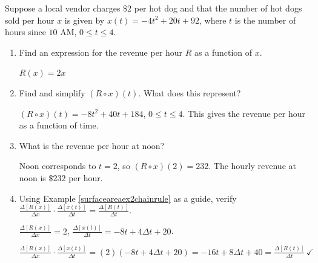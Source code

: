 \documentclass{ximera}
\begin{document}
\begin{problem}
Suppose a local vendor charges $\$2$ per hot dog and that the number of hot dogs sold per hour $x$ is given by $x(t) = -4t^2+20t+92$, where $t$ is the number of hours since $10$ AM, $0 \leq t \leq 4$.

\begin{enumerate}

\item  Find an expression for the revenue per hour $R$ as a function of $x$.

\begin{solution}
     $R(x) = 2x$
\end{solution}

\item  Find and simplify $\left(R \circ x\right)(t)$.  What does this represent?

\begin{solution}
    $\left(R \circ x \right)(t) =  -8t^2+40t+184$, $0 \leq t \leq 4$.  This gives the revenue per hour as a function of time.
\end{solution}

\item  What is the revenue per hour at noon?

\begin{solution}
    Noon corresponds to $t=2$, so $\left(R \circ x \right)(2) = 232$.  The hourly revenue at noon is $\$232$ per hour. 
\end{solution}

\item Using Example \ref{surfaceareaex2chainrule} as a guide, verify $\frac{\Delta[R(x)]}{\Delta x} \cdot \frac{\Delta[x(t)]}{\Delta t} = \frac{\Delta[R(t)]}{\Delta t}$.

\begin{solution}
    $\frac{\Delta[R(x)]}{\Delta x} = 2$,  $\frac{\Delta[x(t)]}{\Delta t} = -8t + 4 \Delta t + 20$.   

 $\frac{\Delta[R(x)]}{\Delta x} \cdot \frac{\Delta[x(t)]}{\Delta t} = (2)(-8t + 4 \Delta t + 20) =   -16t + 8 \Delta t + 40 = \frac{\Delta[R(t)]}{\Delta t} \, \checkmark$
\end{solution}

\end{enumerate}
\end{problem}
\end{document}
